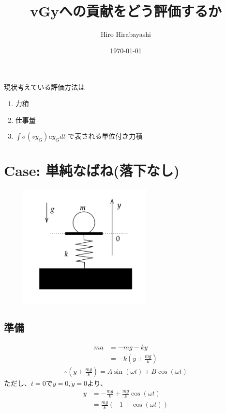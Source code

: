 \documentclass[a4paper,11pt]{jsarticle}
\begin{document}
\title{vGyへの貢献をどう評価するか}
\author{Hiro Hirabayashi}
\date{\today}
\maketitle

現状考えている評価方法は
\begin{enumerate}
  \item 力積
  \item 仕事量
  \item $\int\sigma (vy_G)ay_G dt$ で表される単位付き力積
\end{enumerate}

\section{Case: 単純なばね(落下なし)}

\begin{figure}[h]
  \centering
  \includegraphics[width = 0.6\textwidth]{simple_string.png}
  \caption{}
  \label{simple_string.png}
\end{figure}

\subsection{準備}
\begin{align}
  ma &= -mg - ky
  \\ &= -k\left(y + \frac{mg}{k}\right)
\end{align}
\begin{align}
  \therefore 
  \left(y+\frac{mg}{k}\right) = A\sin(\omega t) + B\cos(\omega t)
\end{align}
ただし、$t=0$で$y=0,\dot{y}=0$より、
\begin{align}
  y &= -\frac{mg}{k} + \frac{mg}{k}\cos(\omega t)
  \\ &= \frac{mg}{k}\left(-1+\cos(\omega t)\right)
\end{align}
\end{document}

